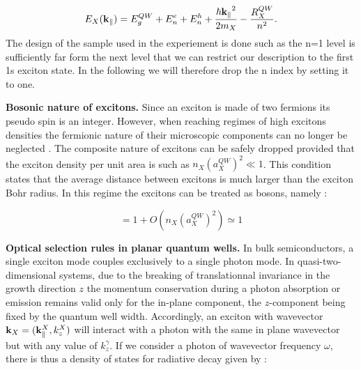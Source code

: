 \begin{equation}
    E_X(\mathbf{k}_\parallel) = E_g^{QW} + E_n^{e} + E_n^{h} +  \dfrac{\mathbf{\hbar k_{\parallel}}^2}{2m_X} - \dfrac{R_X^{QW}}{n^2}.
    \label{eq:2D_exciton_energy}
\end{equation}
The design of the sample used in the experiement is done such as the n=1 level is sufficiently far form the next level that we can restrict our description to 
the first 1s exciton state. In the following we will therefore drop the n index by setting it to one.

\bigskip


\noindent \textbf{Bosonic nature of excitons.} Since an exciton is made of two fermions its pseudo spin is an integer. However, when reaching regimes of high excitons densities
the fermionic nature of their microscopic components can no longer be neglected \cite{Combescot_2007_exact_pol_pol_interactions}. The composite nature of excitons can be safely dropped provided that the exciton density per unit area 
is such as $n_X(a_X^{QW})^2 \ll 1$. This condition states that the average distance between excitons is much larger than the exciton Bohr radius. In this regime the excitons can be treated as bosons, namely : 


\begin{equation}
    [b_{\mathbf{k}}, b^{\dagger}_{\mathbf{k}}] = 1 + O(n_X(a_X^{QW})^2) \simeq 1
    \label{eq:exciton_bosonic_nature}
\end{equation}

\bigskip



\noindent \textbf{Optical selection rules in planar quantum wells.} In bulk semiconductors, a single exciton mode couples exclusively to a single photon mode. In quasi-two-dimensional systems, due to the breaking of translationnal invariance in the growth direction $z$ the momentum
conservation during a photon absorption or emission remains valid only for the in-plane component, the $z$-component being fixed by the quantum well width.
Accordingly, an exciton with wavevector $\mathbf{k}_X=(\mathbf{k}_\parallel^X, k_z^X)$ will interact with a photon with the same in plane wavevector but with any value of $k_z^\gamma$. 
If we consider a photon of wavevector frequency $\omega$, there is thus a density of states for radiative decay given by \cite{weisbuch_microcavities_1996}:

